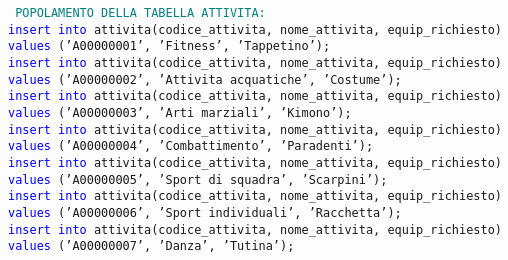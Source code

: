 \documentclass{article}
\begin{document}
    \begin{flushleft}
        \texttt{
        \textcolor{teal}{POPOLAMENTO DELLA TABELLA ATTIVITA:} \\
        \hspace*{0.5em}\textcolor{blue}{insert into} attivita(codice\_attivita, nome\_attivita, equip\_richiesto) \textcolor{blue}{values} \hspace*{0.5em}('A00000001', 'Fitness', 'Tappetino'); \\
        \hspace*{0.5em}\textcolor{blue}{insert into} attivita(codice\_attivita, nome\_attivita, equip\_richiesto) \textcolor{blue}{values} \hspace*{0.5em}('A00000002', 'Attivita acquatiche', 'Costume'); \\
        \hspace*{0.5em}\textcolor{blue}{insert into} attivita(codice\_attivita, nome\_attivita, equip\_richiesto) \textcolor{blue}{values} \hspace*{0.5em}('A00000003', 'Arti marziali', 'Kimono'); \\
        \hspace*{0.5em}\textcolor{blue}{insert into} attivita(codice\_attivita, nome\_attivita, equip\_richiesto) \textcolor{blue}{values} \hspace*{0.5em}('A00000004', 'Combattimento', 'Paradenti'); \\
        \hspace*{0.5em}\textcolor{blue}{insert into} attivita(codice\_attivita, nome\_attivita, equip\_richiesto) \textcolor{blue}{values} \hspace*{0.5em}('A00000005', 'Sport di squadra', 'Scarpini'); \\
        \hspace*{0.5em}\textcolor{blue}{insert into} attivita(codice\_attivita, nome\_attivita, equip\_richiesto) \textcolor{blue}{values} \hspace*{0.5em}('A00000006', 'Sport individuali', 'Racchetta'); \\
        \hspace*{0.5em}\textcolor{blue}{insert into} attivita(codice\_attivita, nome\_attivita, equip\_richiesto) \textcolor{blue}{values} \hspace*{0.5em}('A00000007', 'Danza', 'Tutina'); \\}
    \end{flushleft}
\end{document}
